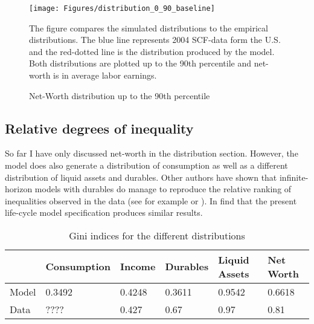 \documentclass[a4paper,12pt,legno]{article}
\begin{document}
\begin{figure}[!htbp]
\caption{Net-Worth distribution up to the 90th percentile} 
\label{wealth_distr_base}	%
\centering
\texttt{[image: Figures/distribution\_0\_90\_baseline]}  %

\begin{minipage}{0.8\linewidth}
\footnotesize{The figure compares the simulated distributions to the empirical distributions. The blue line represents 2004 SCF-data form the U.S. and the red-dotted line is the distribution produced by the model. Both distributions are plotted up to the 90th percentile and net-worth is in average labor earnings.}
\end{minipage}

\end{figure}


\subsection{Relative degrees of inequality}
So far I have only discussed net-worth in the distribution section. However, the model does also generate a distribution of consumption as well as a different distribution of liquid assets and durables. Other authors have shown that infinite-horizon models with durables do manage to reproduce the relative ranking of inequalities observed in the data (see for example \cite{hintermaier2010} or \cite{diaz2010}). In find that the present life-cycle model specification produces similar results.


\begin{table}[!htbp]
\centering
\caption{Gini indices for the different distributions}
\label{Gini_Ranking}
\begin{tabular}{@{}llllll@{}}
\toprule
      & Consumption & Income & Durables & Liquid Assets & Net Worth \\ \midrule
Model & 0.3492      & 0.4248 & 0.3611   & 0.9542        & 0.6618    \\ \midrule
Data  & ????        & 0.427  & 0.67     & 0.97          & 0.81      \\ \bottomrule
\end{tabular}
\end{table}
\end{document}
